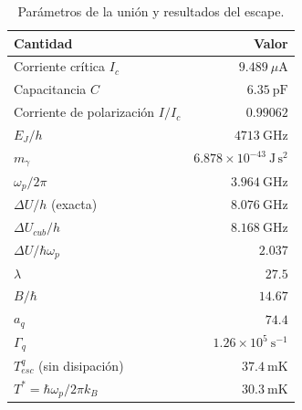 \begin{table}[H]
    \centering
    \caption{Parámetros de la unión y resultados del escape.}
    \label{tab:parametros}
    \begin{tabular}{lr}
        \hline
        Cantidad & Valor \\
        \hline
        Corriente crítica $I_c$ & $9.489\ \mu\mathrm{A}$ \\
        Capacitancia $C$ & $6.35\ \mathrm{pF}$ \\
        Corriente de polarización $I/I_c$ & $0.99062$ \\
        $E_J/h$ & $4713\ \mathrm{GHz}$ \\
        $m_\gamma$ & $6.878\times10^{-43}\ \mathrm{J\,s^2}$ \\
        $\omega_p/2\pi$ & $3.964\ \mathrm{GHz}$ \\
        $\Delta U/h$ (exacta) & $8.076\ \mathrm{GHz}$ \\
        $\Delta U_{cub}/h$ & $8.168\ \mathrm{GHz}$ \\
        $\Delta U/\hbar\omega_p$ & $2.037$ \\
        $\lambda$ & $27.5$ \\
        $B/\hbar$ & $14.67$ \\
        $a_q$ & $74.4$ \\
        $\Gamma_q$ & $1.26\times10^{5}\ \mathrm{s^{-1}}$ \\
        $T_{esc}^{q}$ (sin disipación) & $37.4\ \mathrm{mK}$ \\
        $T^{*}=\hbar\omega_p/2\pi k_B$ & $30.3\ \mathrm{mK}$ \\
        \hline
    \end{tabular}
\end{table}
